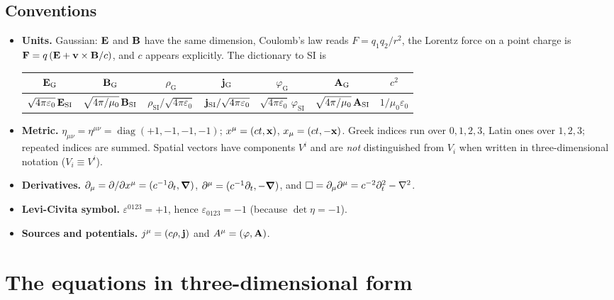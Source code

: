 \subsection{Conventions}

\begin{itemize}
\item \textbf{Units.}  Gaussian: $\mathbf{E}$ and $\mathbf{B}$ have the same dimension,
  Coulomb's law reads $F=q_1q_2/r^2$, the Lorentz force on a point charge
  is $\mathbf{F}=q\,(\mathbf{E}+\mathbf{v}\times\mathbf{B}/c)$, and $c$ appears explicitly.  The
  dictionary to SI is
  \begin{center}
  \begin{tabular}{@{}ccccccc@{}}
  \toprule
  $\mathbf{E}_{\mathrm G}$ & $\mathbf{B}_{\mathrm G}$ & $\rho_{\mathrm G}$ & $\mathbf{j}_{\mathrm G}$ & $\varphi_{\mathrm G}$ & $\mathbf{A}_{\mathrm G}$ & $c^2$\\
  \midrule
  $\sqrt{4\pi\varepsilon_0}\,\mathbf{E}_{\mathrm{SI}}$ &
  $\sqrt{4\pi/\mu_0}\,\mathbf{B}_{\mathrm{SI}}$ &
  $\rho_{\mathrm{SI}}/\sqrt{4\pi\varepsilon_0}$ &
  $\mathbf{j}_{\mathrm{SI}}/\sqrt{4\pi\varepsilon_0}$ &
  $\sqrt{4\pi\varepsilon_0}\,\varphi_{\mathrm{SI}}$ &
  $\sqrt{4\pi/\mu_0}\,\mathbf{A}_{\mathrm{SI}}$ &
  $1/\mu_0\varepsilon_0$\\
  \bottomrule
  \end{tabular}
  \end{center}
\item \textbf{Metric.}  $\eta_{\mu\nu}=\eta^{\mu\nu}=\operatorname{diag}(+1,-1,-1,-1)$;
  $x^\mu=(ct,\mathbf{x})$, $x_\mu=(ct,-\mathbf{x})$.  Greek indices run over $0,1,2,3$,
  Latin ones over $1,2,3$; repeated indices are summed.  Spatial
  vectors have components $V^i$ and are \emph{not} distinguished from
  $V_i$ when written in three-dimensional notation ($V_i\equiv V^i$).
\item \textbf{Derivatives.}  $\partial_\mu=\partial/\partial x^\mu=(c^{-1}\partial_t,\boldsymbol{\nabla})$,
  $\partial^\mu=(c^{-1}\partial_t,-\boldsymbol{\nabla})$, and
  $\Box=\partial_\mu\partial^\mu=c^{-2}\partial_t^2-\nabla^2$.
\item \textbf{Levi-Civita symbol.}  $\varepsilon^{0123}=+1$, hence
  $\varepsilon_{0123}=-1$ (because $\det\eta=-1$).
\item \textbf{Sources and potentials.}  $j^\mu=(c\rho,\mathbf{j})$ and
  $A^\mu=(\varphi,\mathbf{A})$.
\end{itemize}

\section{The equations in three-dimensional form}\label{sec:mx-eqs}

